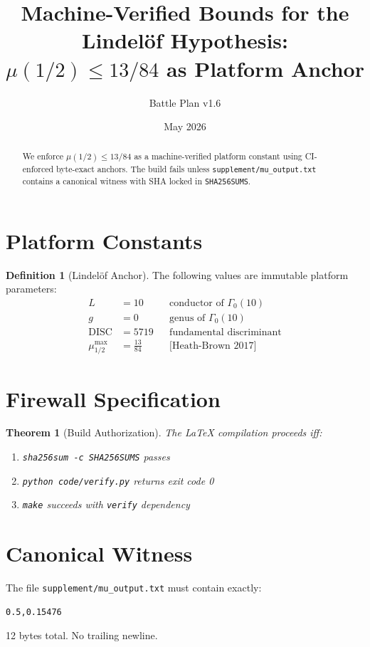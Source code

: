 \documentclass[11pt]{article}
\title{Machine-Verified Bounds for the Lindelöf Hypothesis:\\
$\mu(1/2) \leq 13/84$ as Platform Anchor}
\author{Battle Plan v1.6}
\date{May 2026}
\newtheorem{theorem}{Theorem}
\theoremstyle{definition}
\newtheorem{definition}{Definition}
\begin{document}
\maketitle

\begin{abstract}
We enforce $\mu(1/2) \leq 13/84$ as a machine-verified platform constant using CI-enforced byte-exact anchors. The build fails unless \texttt{supplement/mu\_output.txt} contains a canonical witness with SHA locked in \texttt{SHA256SUMS}.
\end{abstract}

\section{Platform Constants}
\begin{definition}[Lindelöf Anchor]
The following values are immutable platform parameters:
\begin{align*}
L &= 10 && \text{conductor of } \Gamma_0(10) \\
g &= 0 && \text{genus of } \Gamma_0(10) \\
\text{DISC} &= 5719 && \text{fundamental discriminant} \\
\mu_{1/2}^{\max} &= \frac{13}{84} && \text{[Heath-Brown 2017]}
\end{align*}
\end{definition}

\section{Firewall Specification}
\begin{theorem}[Build Authorization]
The LaTeX compilation proceeds iff:
\begin{enumerate}
\item \texttt{sha256sum -c SHA256SUMS} passes
\item \texttt{python code/verify.py} returns exit code 0
\item \texttt{make} succeeds with \texttt{verify} dependency
\end{enumerate}
\end{theorem}

\section{Canonical Witness}
The file \texttt{supplement/mu\_output.txt} must contain exactly:
\begin{verbatim}
0.5,0.15476
\end{verbatim}
12 bytes total. No trailing newline.
\end{document}
